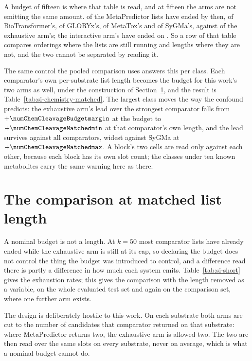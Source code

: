 \documentclass[journal=jcisd8,manuscript=suppinfo,layout=onecolumn]{achemso}
\begin{document}
A budget of fifteen is where that table is read, and at fifteen the \numChemArmsWord{} arms are not
emitting the
same amount. \numChemExhaustedMetapredictor{} of the \numPopulationN{} MetaPredictor lists have
ended by then, \numChemExhaustedBiotransformer{} of BioTransformer's,
\numChemExhaustedGloryx{} of GLORYx's, \numChemExhaustedMetatox{} of MetaTox's and
\numChemExhaustedSygma{} of SyGMa's, against \numChemExhaustedBank{} of the exhaustive arm's;
the interactive arm's have ended on \numChemExhaustedInteractive{}. So a row of that table
compares orderings where the lists are still running and lengths where they are not, and the two
cannot be separated by reading it.

The same control the pooled comparison uses answers this per class. Each comparator's own
per-substrate list length becomes the budget for this work's two arms as well, under the
construction of Section~\ref{sec:si-matched}, and the result is
Table~\ref{tab:si-chemistry-matched}. The largest class moves the way the confound predicts: the
exhaustive arm's lead over the strongest comparator falls from $+\numChemCleavageBudgetmargin$ at
the budget to $+\numChemCleavageMatchedmin$ at that comparator's own length, and the lead survives
against all \numChemCleavageMatchedarmsWord{} comparators, widest against SyGMa at
$+\numChemCleavageMatchedmax$. A block's two cells are read only against each other, because
each block has its own slot count; the classes under ten known metabolites carry
the same warning here as there.



\section{The comparison at matched list length}
\label{sec:si-matched}

A nominal budget is not a length. At $k = 50$ most comparator lists have already ended while the
exhaustive arm is still at its cap, so declaring the budget does not control the thing the budget
was introduced to control, and a difference read there is partly a difference in how much each
system emits. Table~\ref{tab:si-short} gives the exhaustion rates; this gives the comparison
with the length removed as a variable, on the whole evaluated test set and again on the
comparison set, where one further arm exists.




The design is deliberately hostile to this work. On each substrate both arms are cut to the number
of candidates that comparator returned on that substrate: where MetaPredictor returns two, the
exhaustive arm is allowed two. The two are then read over the same slots on every substrate, never
on average, which is what a nominal budget cannot do.
\end{document}
